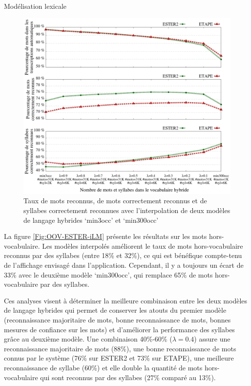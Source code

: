 \documentclass{style/these}
\begin{document}
\begin{part}{Modélisation lexicale}
\begin{figure}[h!]
\centering
\includegraphics[scale=0.59]{images/results/statsWS_mixedLMs-3-300}
\caption{Taux de mots reconnus, de mots correctement reconnus et de syllabes correctement reconnues avec l'interpolation de deux modèles de langage hybrides `min3occ' et `min300occ'}
\label{Fig:statsWS-mix}
\end{figure}

La figure \ref{Fig:OOV-ESTER-iLM} présente les résultats sur les mots hors-vocabulaire. 
Les modèles interpolés améliorent le taux de mots hors-vocabulaire reconnus par des syllabes (entre 18\% et 32\%), ce qui est bénéfique compte-tenu de l'affichage envisagé dans l'application. Cependant, il y a toujours un écart de 33\% avec le deuxième modèle `min300occ', qui remplace 65\% de mots hors-vocabulaire par des syllabes.


Ces analyses visent à déterminer la meilleure combinaison entre les deux modèles de langage hybrides qui permet de conserver les atouts du premier modèle (reconnaissance majoritaire de mots, bonne reconnaissance de mots, bonnes mesures de confiance sur les mots) et d'améliorer la performance des syllabes grâce au deuxième modèle.  
Une combinaison 40\%-60\% ($\lambda=0.4$) assure une reconnaissance majoritaire de mots (88\%), une bonne reconnaissance de mots connus par le système (76\% sur ESTER2 et 73\% sur ETAPE), une meilleure reconnaissance de syllabe (60\%) et elle double la quantité de mots hors-vocabulaire qui sont reconnus par des syllabes (27\% comparé au 13\%).


\end{part}
\end{document}
